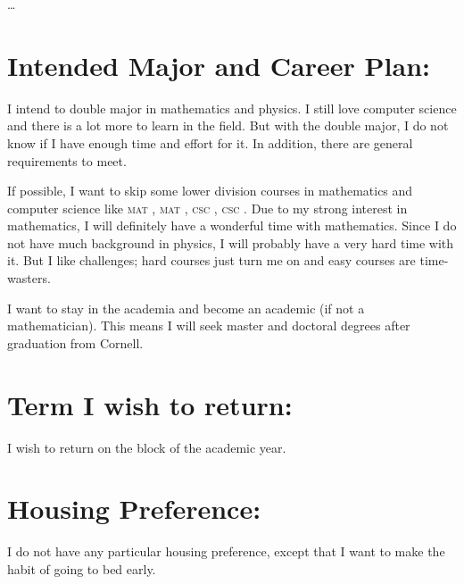 	\dots
	
	\section*{Intended Major and Career Plan:}
	I intend to double major in mathematics and physics. I still love computer
	science and there is a lot more to learn in the field. But with the double
	major, I do not know if I have enough time and effort for it. In addition,
	there are general requirements to meet.
	
	If possible, I want to skip some lower division courses in mathematics and
	computer science like \textsc{mat} , \textsc{mat} ,
	\textsc{csc} , \textsc{csc} . Due to my strong interest in
	mathematics, I will definitely have a wonderful time with mathematics. Since I
	do not have much background in physics, I will probably have a very hard time
	with it. But I like challenges; hard courses just turn me on and easy courses
	are time-wasters.
	
	I want to stay in the academia and become an academic (if not a mathematician).
	This means I will seek master and doctoral degrees after graduation from
	Cornell.
	
	\section*{Term I wish to return:}
	I wish to return on the block  of the  academic year.
	
	\section*{Housing Preference:}
	I do not have any particular housing preference, except that I want to make the
	habit of going to bed early.
	
	\nocite{*}
	
	\clearpage
	
	\printbibliography
